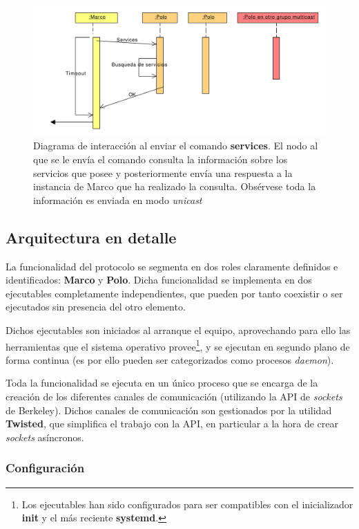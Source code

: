 \begin{figure}[H]
\centering
\includegraphics[width=\textwidth]{Diagrams/Sequence/services}
\caption{Diagrama de interacción al enviar el comando \textbf{services}. El nodo al que se le envía el comando consulta la información sobre los servicios que posee y posteriormente envía una respuesta a la instancia de Marco que ha realizado la consulta. Obsérvese toda la información es enviada en modo \textit{unicast}}
\label{fig:secuencia_services}
\end{figure}

\subsection{Arquitectura en detalle}

La funcionalidad del protocolo se segmenta en dos roles claramente definidos e identificados: \textbf{Marco} y \textbf{Polo}. Dicha funcionalidad se implementa en dos ejecutables completamente independientes, que pueden por tanto coexistir o ser ejecutados sin presencia del otro elemento.

Dichos ejecutables son iniciados al arranque el equipo, aprovechando para ello las herramientas que el sistema operativo provee\footnote{Los ejecutables han sido configurados para ser compatibles con el inicializador \textbf{init} y el más reciente \textbf{systemd}.}, y se ejecutan en segundo plano de forma continua (es por ello pueden ser categorizados como procesos \textit{daemon}).

Toda la funcionalidad se ejecuta en un único proceso que se encarga de la creación de los diferentes canales de comunicación (utilizando la API de \textit{sockets} de Berkeley). Dichos canales de comunicación son gestionados por la utilidad \textbf{Twisted}, que simplifica el trabajo con la API, en particular a la hora de crear \textit{sockets} asíncronos.

\subsubsection{Configuración}

